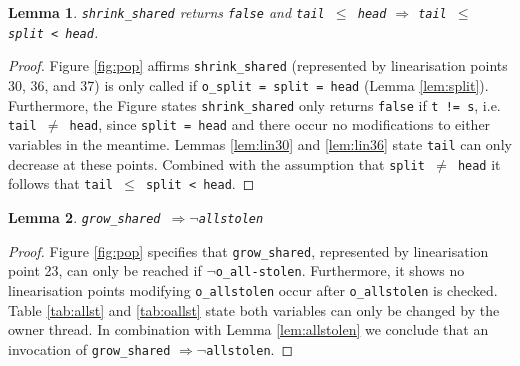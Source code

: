 \documentclass{sig-alternate-br}
\newtheorem{lemma}{Lemma}
\begin{document}
\begin{lemma}
	\texttt{shrink\_shared} returns \texttt{false} and \texttt{tail $\leq$ head} $\Rightarrow$ \texttt{tail $\leq$ split < head}.
	\label{lem:shrsh.var}
\end{lemma}
\begin{proof}
	Figure \ref{fig:pop} affirms \texttt{shrink\_shared} (represented by linearisation points 30, 36, and 37) is only called if \texttt{o\_split = split = head} (Lemma \ref{lem:split}).
	Furthermore, the Figure states \texttt{shrink\_shared} only returns \texttt{false} if \texttt{t != s}, i.e. \texttt{tail $\neq$ head}, since \texttt{split = head} and there occur no modifications to either variables in the meantime.
	Lemmas \ref{lem:lin30} and \ref{lem:lin36} state \texttt{tail} can only decrease at these points. 
	Combined with the assumption that \texttt{split $\neq$ head} it follows that \texttt{tail $\leq$ split < head}.
\end{proof}

\begin{lemma}
	\texttt{grow\_shared $\Rightarrow \neg$allstolen}
	\label{lem:grshr}
\end{lemma}
\begin{proof}
	Figure \ref{fig:pop} specifies that \texttt{grow\_shared}, represented by linearisation point 23, can only be reached if \texttt{$\neg$o\_all-stolen}.
	Furthermore, it shows no linearisation points modifying \texttt{o\_allstolen} occur after \texttt{o\_allstolen} is checked.
	Table \ref{tab:allst} and \ref{tab:oallst} state both variables can only be changed by the owner thread.
	In combination with Lemma \ref{lem:allstolen} we conclude that an invocation of \texttt{grow\_shared} $\Rightarrow \neg$\texttt{allstolen}.
\end{proof}
\end{document}
